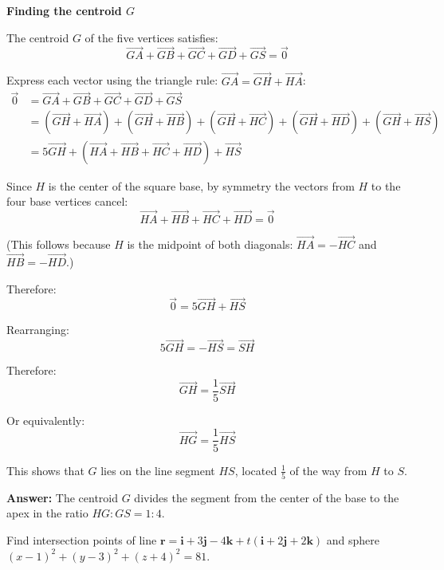 \begin{solution}
\textbf{Finding the centroid $G$}

The centroid $G$ of the five vertices satisfies:
$$\overrightarrow{GA} + \overrightarrow{GB} + \overrightarrow{GC} + \overrightarrow{GD} + \overrightarrow{GS} = \vec{0}$$

Express each vector using the triangle rule: $\overrightarrow{GA} = \overrightarrow{GH} + \overrightarrow{HA}$:
\begin{align*}
\vec{0} &= \overrightarrow{GA} + \overrightarrow{GB} + \overrightarrow{GC} + \overrightarrow{GD} + \overrightarrow{GS} \\
&= (\overrightarrow{GH} + \overrightarrow{HA}) + (\overrightarrow{GH} + \overrightarrow{HB}) + (\overrightarrow{GH} + \overrightarrow{HC}) + (\overrightarrow{GH} + \overrightarrow{HD}) + (\overrightarrow{GH} + \overrightarrow{HS}) \\
&= 5\overrightarrow{GH} + (\overrightarrow{HA} + \overrightarrow{HB} + \overrightarrow{HC} + \overrightarrow{HD}) + \overrightarrow{HS}
\end{align*}

Since $H$ is the center of the square base, by symmetry the vectors from $H$ to the four base vertices cancel:
$$\overrightarrow{HA} + \overrightarrow{HB} + \overrightarrow{HC} + \overrightarrow{HD} = \vec{0}$$

(This follows because $H$ is the midpoint of both diagonals: $\overrightarrow{HA} = -\overrightarrow{HC}$ and $\overrightarrow{HB} = -\overrightarrow{HD}$.)

Therefore:
$$\vec{0} = 5\overrightarrow{GH} + \overrightarrow{HS}$$

Rearranging:
$$5\overrightarrow{GH} = -\overrightarrow{HS} = \overrightarrow{SH}$$

Therefore:
$$\overrightarrow{GH} = \frac{1}{5}\overrightarrow{SH}$$

Or equivalently:
$$\overrightarrow{HG} = \frac{1}{5}\overrightarrow{HS}$$

This shows that $G$ lies on the line segment $HS$, located $\frac{1}{5}$ of the way from $H$ to $S$.

\textbf{Answer:} The centroid $G$ divides the segment from the center of the base to the apex in the ratio $HG:GS = 1:4$.
\end{solution}

\vspace{1em}

\begin{problem}
Find intersection points of line $\mathbf{r} = \mathbf{i} + 3\mathbf{j} - 4\mathbf{k} + t(\mathbf{i} + 2\mathbf{j} + 2\mathbf{k})$ and sphere $(x-1)^2 + (y-3)^2 + (z+4)^2 = 81$.
\end{problem}

